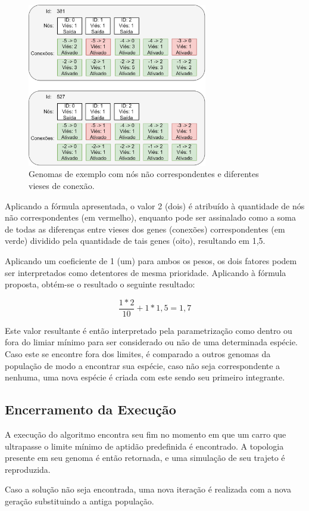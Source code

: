 \begin{figure}[htb]
        \centering
        \caption{\label{fig_NA}Genomas de exemplo com nós não correspondentes e diferentes vieses de conexão.}
        \includegraphics[width=0.7\textwidth]{images/NA.png}
\end{figure}

Aplicando a fórmula apresentada, o valor 2 (dois) é atribuído à quantidade de nós não correspondentes (em vermelho), enquanto \textit{} pode ser assinalado como a soma de todas as diferenças entre vieses dos genes (conexões) correspondentes (em verde) dividido pela quantidade de tais genes (oito), resultando em 1,5.

Aplicando um coeficiente de 1 (um) para ambos os pesos, os dois fatores podem ser interpretados como detentores de mesma prioridade. Aplicando à fórmula proposta, obtém-se o resultado o seguinte resultado:

\[ \frac{1 * 2}{10} + 1 * 1,5 = 1,7\]

Este valor resultante é então interpretado pela parametrização como dentro ou fora do limiar mínimo para ser considerado ou não de uma determinada espécie. Caso este se encontre fora dos limites, é comparado a outros genomas da população de modo a encontrar sua espécie, caso não seja correspondente a nenhuma, uma nova espécie é criada com este sendo seu primeiro integrante.

\subsection{Encerramento da Execução}
A execução do algoritmo encontra seu fim no momento em que um carro que ultrapasse o limite mínimo de aptidão predefinida é encontrado. A topologia presente em seu genoma é então retornada, e uma simulação de seu trajeto é reproduzida.

Caso a solução não seja encontrada, uma nova iteração é realizada com a nova geração substituindo a antiga população.



